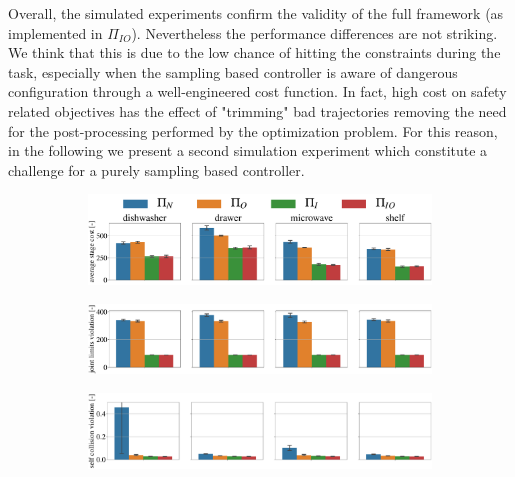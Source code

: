 Overall, the simulated experiments confirm the validity of the full framework (as implemented in $\Pi_{IO}$). Nevertheless the performance differences are not striking. We think that this is due to the low chance of hitting the constraints during the task, especially when the sampling based controller is aware of dangerous configuration through a well-engineered cost function. In fact, high cost on safety related objectives has the effect of "trimming" bad trajectories removing the need for the post-processing performed by the optimization problem. For this reason, in the following we present a second simulation experiment which constitute a challenge for a purely sampling based controller. 

\begin{figure}[t]
\centering
\hspace*{-0.2cm}
\vspace*{0.15cm}
\begin{subfigure}{1\columnwidth}
    \includegraphics[width=\linewidth]{figures/methods_comparison/average_stage_cost.pdf}
\end{subfigure}%
\hfill
\hspace*{-0.2cm}
\vspace*{0.1cm}
\begin{subfigure}{\columnwidth}
    \includegraphics[width=\linewidth]{figures/methods_comparison/joint_limits.pdf}
\end{subfigure}%
\hfill
\hspace*{-0.2cm}
\vspace*{0.1cm}
\begin{subfigure}{\columnwidth}
    \includegraphics[width=\linewidth]{figures/methods_comparison/self_collision.pdf}

\end{subfigure}
\end{figure}
